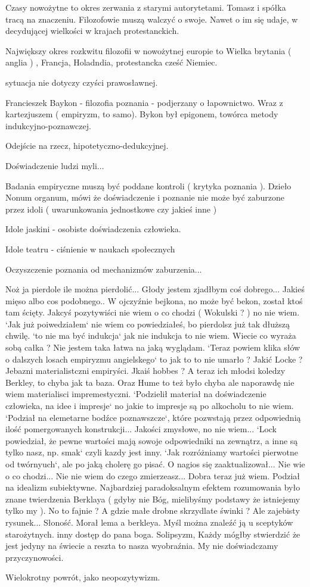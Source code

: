 \documentclass[11pt]{article}
\begin{document}
Czasy nowożytne to okres zerwania z starymi autorytetami. Tomasz i spółka tracą na znaczeniu. Filozofowie muszą walczyć o swoje. Nawet o im się udaje, w decydującej wielkości w krajach protestanckich.

Największy okres rozkwitu filozofii w nowożytnej europie to Wielka brytania ( anglia ) , Francja, Holadndia, protestancka cześć Niemiec.

sytuacja nie dotyczy czyści prawosławnej.

Francieszek Baykon - filozofia poznania - podjerzany o łapownictwo. Wraz z kartezjuszem ( empiryzm, to samo). Bykon był epigonem, towórca metody indukcyjno-poznawczej.

Odejście na rzecz, hipotetyczno-dedukcyjnej.

Doświadczenie ludzi myli...


Badania empiryczne muszą być poddane kontroli ( krytyka poznania ). Dzieło Nonum organum, mówi że doświadczenie i poznanie nie może być zaburzone przez idoli ( uwarunkowania jednostkowe czy jakieś inne )

Idole jaskini - osobiste doświadczenia człowieka.

Idole teatru - ciśnienie w naukach społecznych

Oczyszczenie poznania od mechanizmów zaburzenia...

Noż ja pierdole ile można pierdolić... Głody jestem zjadłbym coś dobrego... Jakieś mięso albo cos podobnego.. W ojczyźnie bejkona, no może być bekon, został ktoś tam ścięty. Jakcyś pozytywiści nie wiem o co chodzi ( Wokulski ? ) no nie wiem. `Jak już poiwedziałem` nie wiem co powiedziałeś, bo pierdolsz już tak dłuższą chwilę. `to nie ma być indukcja` jak nie indukcja to nie wiem. Wiecie co wyraża sobą całka ? Nie jestem taka łatwa na jaką wyglądam. `Teraz powiem klika słów o dalszych losach empiryzmu angielskego` to jak to to nie umarło ? Jakić Locke ? Jebazni materialistczni empiryści. Jkaiś hobbes ? A teraz ich młodsi koledzy Berkley, to chyba jak ta baza. Oraz Hume to też było chyba ale naporawdę nie wiem materialisci impremestyczni. `Podzielił materiał na doświadczenie człowieka, na idee i impresje` no jakie to impresje są po alkocholu to nie wiem. `Podział na elemetarne bodźce poznawszcze`, które pozwstają przez odpowiednią ilość pomergowanych konstrukcji... Jakości zmysłowe, no nie wiem... 
`Lock powiedział, że pewne wartości mają sowoje odpowiedniki na zewnątrz, a inne są tylko nasz, np. smak` czyli kazdy jest inny. `Jak rozróżniamy wartości pierwotne od twórnyuch`, ale po jaką cholerę go pisać. O nagios się zaaktualizował... Nie wie o co chodzi... Nie nie wiem do czego zmierzeasz... 
Dobra teraz już wiem. Podział na idealizm subiektywne. Najbardziej paradoksalnym efektem rozumowania było znane twierdzenia Berklaya ( gdyby nie Bóg, mielibyśmy podstawy że istniejemy tylko my ). No to fajnie  ? A gdzie małe drobne skrzydlate świnki ? Ale zajebisty rysunek... Słoność. Morał lema a berkleya.
Myśl można znaleźć ją u sceptyków starożytnych. inny dostęp do pana boga. Solipsyzm, Każdy mógłby stwierdzić że jest jedyny na świecie a reszta to nasza wyobraźnia.
My nie doświadczamy przyczynowości.

Wielokrotny powrót, jako neopozytywizm. 
 
\end{document}
